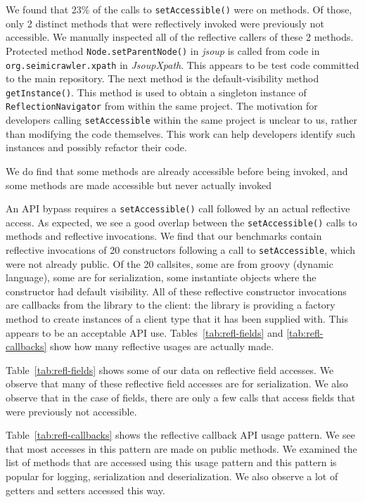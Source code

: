 We found that 23\% of the calls to \texttt{setAccessible()} were on methods. Of those, only 2 distinct methods that were reflectively invoked were previously not accessible. We manually inspected all of the reflective callers of these 2 methods. Protected method \texttt{Node.setParentNode()} in \emph{jsoup} is called from code in \texttt{org.seimicrawler.xpath} in \emph{JsoupXpath}. This appears to be test code committed to the main repository. The next method is the default-visibility method \texttt{getInstance()}. This method is used to obtain a singleton instance of {\tt ReflectionNavigator} from within the same project. The motivation for developers calling \texttt{setAccessible} within the same project is unclear to us, rather than modifying the code themselves. This work can help developers identify such instances and possibly refactor their code.

We do find that some methods are already accessible before being invoked, and some methods are made accessible but never actually invoked

An API bypass requires a \texttt{setAccessible()} call followed by an
actual reflective access.  As expected, we see a good overlap between the
\texttt{setAccessible()} calls to methods and reflective invocations.
We find that our benchmarks contain reflective invocations of 20 constructors following a call to \texttt{setAccessible}, which were not already public. Of the 20 callsites, some are from groovy (dynamic language), some are for serialization, some instantiate objects where the constructor had default visibility. All of these reflective constructor invocations are callbacks from the library to the client: the library is providing a factory method to create instances of a client type that it has been supplied with. This appears to be an acceptable API use.
Tables~\ref{tab:refl-fields} and \ref{tab:refl-callbacks} show how many reflective usages are actually made.

Table~\ref{tab:refl-fields} shows some of our data on reflective field accesses. We observe that many of these reflective field accesses are for serialization. We also observe that in the case of fields, there are only a few calls that access fields that were previously not accessible.


Table~\ref{tab:refl-callbacks} shows the reflective callback API usage pattern. We see that most accesses in this pattern are made on public methods. We examined the list of methods that are accessed using this usage pattern and this pattern is popular for logging, serialization and deserialization. We also observe a lot of getters and setters accessed this way.



